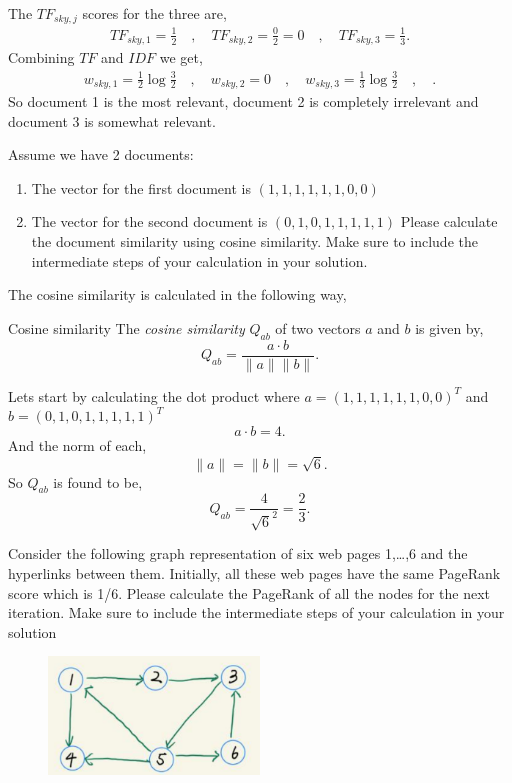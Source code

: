 \documentclass[working, oneside]{../../Preambles/tuftebook}
\begin{document}
The $TF_{sky, j}$ scores for the three are,
\begin{align*}
    TF_{sky, 1} = \frac{1}{2} \quad, \quad
    TF_{sky, 2} = \frac{0}{2} = 0 \quad,\quad
    TF_{sky, 3} = \frac{1}{3}
.\end{align*}
Combining $TF$ and $IDF$ we get,
 \begin{align*}
    w_{sky, 1} = \frac{1}{2}\log \frac{3}{2} \quad, \quad    w_{sky, 2} =0 \quad, \quad    w_{sky, 3} =\frac{1}{3}\log \frac{3}{2} \quad, \quad
.\end{align*}
So document 1 is the most relevant, document 2 is completely irrelevant and document 3 is somewhat relevant.
\begin{exercise}[b]
Assume we have 2 documents:
\begin{enumerate}
    \item The vector for the first document is $(1,1,1,1,1,1,0,0)$
    \item The vector for the second document is $(0,1,0,1,1,1,1,1)$
Please calculate the document similarity using cosine similarity. Make sure to include the intermediate steps of your calculation in your solution.
\end{enumerate}
\end{exercise}
The cosine similarity is calculated in the following way,
\begin{SimpleBox}{Cosine similarity}
    The \textit{cosine similarity} $Q_{ab}$ of two vectors $a$ and $b$ is given by,
     \[
    Q_{ab} = \frac{a \cdot b}{\|a\|\|b\|}
    .\] 
\end{SimpleBox}
Lets start by calculating the dot product where $a = (1,1,1,1,1,1,0,0)^{T}$ and $b =(0,1,0,1,1,1,1,1)^{T}$
\[
a\cdot b = 4
.\] 
And the norm of each,
\[
\|a\| = \|b\|=\sqrt{6} 
.\] 
So $Q_{ab}$ is found to be,
\[
Q_{ab} = \frac{4}{\sqrt{6} ^2} = \frac{2}{3}
.\]  
\newpage
\begin{exercise}[c]
 Consider the following graph representation of six web pages 1,…,6 and the
hyperlinks between them. Initially, all these web pages have the same PageRank
score which is 1/6. Please calculate the PageRank of all the nodes for the next
iteration. Make sure to include the intermediate steps of your calculation in your
solution
\end{exercise}
\begin{figure}[htpb]
    \centering
    \includegraphics[width=0.5\textwidth]{afl7.png}
\end{figure}
\end{document}
